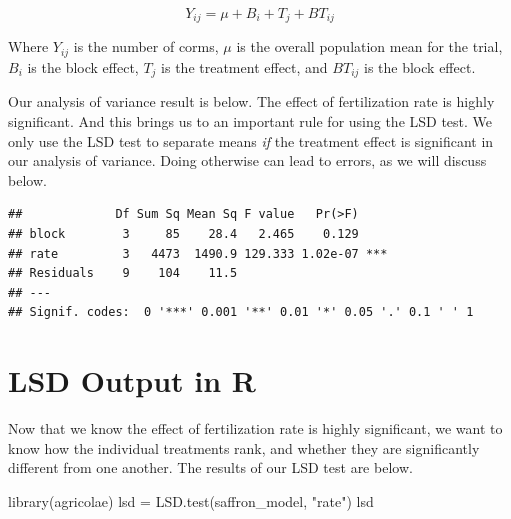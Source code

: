 \documentclass[
]{book}
\newenvironment{Shaded}{\begin{snugshade}}{\end{snugshade}}
\newcommand{\FunctionTok}[1]{\textcolor[rgb]{0.00,0.00,0.00}{#1}}
\newcommand{\NormalTok}[1]{#1}
\newcommand{\OtherTok}[1]{\textcolor[rgb]{0.56,0.35,0.01}{#1}}
\newcommand{\SpecialCharTok}[1]{\textcolor[rgb]{0.00,0.00,0.00}{#1}}
\newcommand{\StringTok}[1]{\textcolor[rgb]{0.31,0.60,0.02}{#1}}
\begin{document}
\[ Y_{ij} = \mu +B_i + T_j + BT_{ij}\]

Where \(Y_{ij}\) is the number of corms, \(\mu\) is the overall population mean for the trial, \(B_i\) is the block effect, \(T_j\) is the treatment effect, and \(BT_{ij}\) is the block effect.

Our analysis of variance result is below. The effect of fertilization rate is highly significant. And this brings us to an important rule for using the LSD test. We only use the LSD test to separate means \emph{if} the treatment effect is significant in our analysis of variance. Doing otherwise can lead to errors, as we will discuss below.

\begin{Shaded}
\end{Shaded}

\begin{verbatim}
##             Df Sum Sq Mean Sq F value   Pr(>F)    
## block        3     85    28.4   2.465    0.129    
## rate         3   4473  1490.9 129.333 1.02e-07 ***
## Residuals    9    104    11.5                     
## ---
## Signif. codes:  0 '***' 0.001 '**' 0.01 '*' 0.05 '.' 0.1 ' ' 1
\end{verbatim}

\hypertarget{lsd-output-in-r}{%
\section{LSD Output in R}\label{lsd-output-in-r}}

Now that we know the effect of fertilization rate is highly significant, we want to know how the individual treatments rank, and whether they are significantly different from one another. The results of our LSD test are below.

\begin{Shaded}
\begin{Highlighting}[]
\FunctionTok{library}\NormalTok{(agricolae)}
\NormalTok{lsd }\OtherTok{=} \FunctionTok{LSD.test}\NormalTok{(saffron\_model, }\StringTok{"rate"}\NormalTok{)}
\NormalTok{lsd}
\end{Highlighting}
\end{Shaded}
\end{document}
